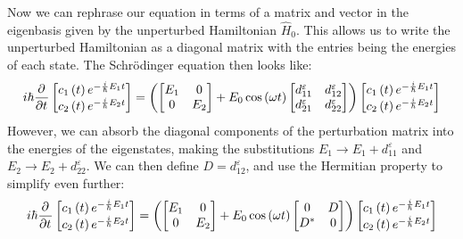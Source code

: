 Now we can rephrase our equation in terms of a matrix and vector in the eigenbasis given by the
unperturbed Hamiltonian $\hat{H}_0$. This allows us to write the unperturbed Hamiltonian as a
diagonal matrix with the entries being the energies of each state. The Schrödinger equation then
looks like:
\begin{equation}
i\hbar\frac{\partial^{}}{\partial t^{}} 
\begin{bmatrix}
    c_1\left(t\right) e^{-\frac{i}{\hbar} E_1 t} \\
    c_2\left(t\right) e^{-\frac{i}{\hbar} E_2 t}
\end{bmatrix}
=
\left(
\begin{bmatrix} E_1 & 0 \\ 0 & E_2 \end{bmatrix} + E_0 \cos \left(\omega t\right)
\begin{bmatrix}
    d^{\varepsilon}_{11} & d^{\varepsilon}_{12} \\
    d^{\varepsilon}_{21} & d^{\varepsilon}_{22}
\end{bmatrix}
\right) 
\begin{bmatrix}
    c_1\left(t\right) e^{-\frac{i}{\hbar} E_1 t} \\
    c_2\left(t\right) e^{-\frac{i}{\hbar} E_2 t}
\end{bmatrix}
\end{equation}
However, we can absorb the diagonal components of the perturbation matrix into the energies of the
eigenstates, making the substitutions $E_1 \to E_1 + d^{\varepsilon}_{11}$ and 
$E_2 \to E_2 + d^{\varepsilon}_{22}$. We can then define $D = d^{\varepsilon}_{12}$, and use the
Hermitian property to simplify even further:
\begin{equation}
i\hbar\frac{\partial^{}}{\partial t^{}} 
\begin{bmatrix}
    c_1\left(t\right) e^{-\frac{i}{\hbar} E_1 t} \\
    c_2\left(t\right) e^{-\frac{i}{\hbar} E_2 t}
\end{bmatrix}
=
\left(
\begin{bmatrix} E_1 & 0 \\ 0 & E_2 \end{bmatrix} + E_0 \cos \left(\omega t\right)
\begin{bmatrix} 0 & D \\ D^* & 0 \end{bmatrix}
\right) 
\begin{bmatrix}
    c_1\left(t\right) e^{-\frac{i}{\hbar} E_1 t} \\
    c_2\left(t\right) e^{-\frac{i}{\hbar} E_2 t}
\end{bmatrix}
\end{equation}
